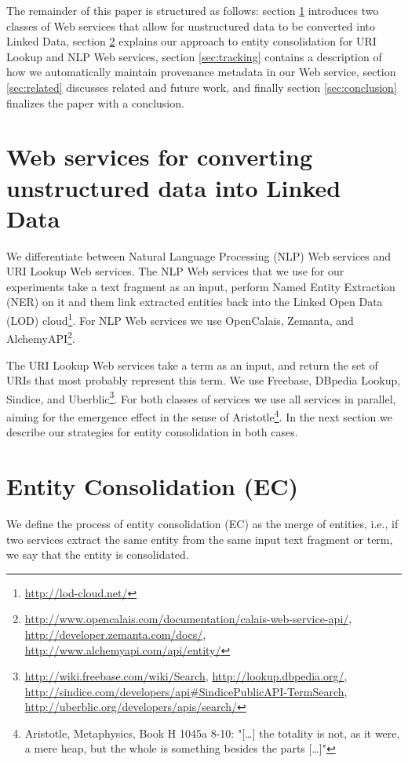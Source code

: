 \documentclass{acm_proc_article-sp}
\begin{document}
The remainder of this paper is structured as follows: section \ref{sec:services} introduces two classes of Web services that allow for unstructured data to be converted into Linked Data, section \ref{sec:consolidation} explains our approach to entity consolidation for URI Lookup and NLP Web services, section \ref{sec:tracking} contains a description of how we automatically maintain provenance metadata in our Web service, section \ref{sec:related} discusses related and future work, and finally section \ref{sec:conclusion} finalizes the paper with a conclusion.

\section{Web services for converting unstructured data into Linked Data}\label{sec:services}
We differentiate between Natural Language Processing (NLP) Web services and URI Lookup Web services. The NLP Web services that we use for our experiments take a text fragment as an input, perform Named Entity Extraction (NER) on it and them link extracted entities back into the Linked Open Data (LOD) cloud\footnote{\url{http://lod-cloud.net/}}. For NLP Web services we use OpenCalais, Zemanta, and AlchemyAPI\footnote{\url{http://www.opencalais.com/documentation/calais-web-service-api/}, \url{http://developer.zemanta.com/docs/}, \url{http://www.alchemyapi.com/api/entity/}}.

The URI Lookup Web services take a term as an input, and return the set of URIs that most probably represent this term. We use Freebase, DBpedia Lookup, Sindice, and Uberblic\footnote{\url{http://wiki.freebase.com/wiki/Search}, \url{http://lookup.dbpedia.org/}, \url{http://sindice.com/developers/api#SindicePublicAPI-TermSearch}, \url{http://uberblic.org/developers/apis/search/}}. For both classes of services we use all services in parallel, aiming for the emergence effect in the sense of Aristotle\footnote{Aristotle, Metaphysics, Book H 1045a 8-10: "[\ldots] the totality is not, as it were, a mere heap, but the whole is something besides the parts [\ldots]"}. In the next section we describe our strategies for entity consolidation in both cases. 

\section{Entity Consolidation (EC)}\label{sec:consolidation}
We define the process of entity consolidation (EC) as the merge of entities, i.e., if two services extract the same entity from the same input text fragment or term, we say that the entity is consolidated.
\end{document}
